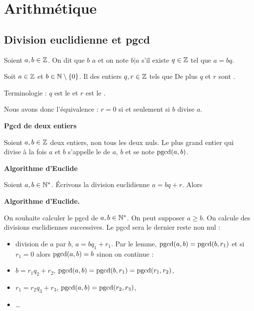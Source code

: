 \documentclass[10pt,class=article,crop=false]{standalone}
\begin{document}
	
	
\section{Arithmétique}

\begin{multicols}{2}
	
	
\subsection{Division euclidienne et pgcd}

Soient $a,b \in \mathbb{Z}$. On dit que $b$  $a$ et on note $b | a$ s'il existe $q \in \mathbb{Z}$ tel que $a = bq$.

\begin{theoreme}
	Soit $a\in \mathbb{Z}$ et $b\in \mathbb{N}\setminus \{0\}$.
	Il  des entiers $q,r \in \mathbb{Z}$ tels que
	De plus $q$ et $r$ sont .
\end{theoreme}

Terminologie : $q$ est le  et $r$ est le .


Nous avons donc l'équivalence : $r=0$ si et seulement si $b$ divise $a$.



\textbf{Pgcd de deux entiers}

	Soient $a,b\in\mathbb{Z}$ deux entiers, non tous les deux nuls.
	Le plus grand entier qui divise à la fois $a$ et $b$ s'appelle
	le  de $a$, $b$
	et se note $\mathop{\text{pgcd}}(a,b)$.
	


\textbf{Algorithme d'Euclide}

\begin{lemme}
	\label{lem:algoeuclide}
	Soient $a,b \in \mathbb{N}^*$. \'Ecrivons la division euclidienne $a=bq+r$.
	Alors
\end{lemme}



\textbf{Algorithme d'Euclide.}

On souhaite calculer le pgcd de $a,b \in \mathbb{N}^*$. On peut supposer $a \ge b$.
On calcule des divisions euclidiennes successives. Le pgcd sera le dernier reste
non nul :
\begin{itemize}
	\item division de $a$ par $b$, $a=bq_1+r_1$. Par le lemme, $\mathop{\text{pgcd}}(a,b)=\mathop{\text{pgcd}}(b,r_1)$ et
	si $r_1=0$ alors $\mathop{\text{pgcd}}(a,b)=b$ sinon on continue :
	\item $b=r_1 q_2 + r_2$,  \quad $\mathop{\text{pgcd}}(a,b)= \mathop{\text{pgcd}}(b,r_1)=\mathop{\text{pgcd}}(r_1,r_2)$,
	\item $r_1 = r_2 q_3 + r_3$, \quad $\mathop{\text{pgcd}}(a,b)=\mathop{\text{pgcd}}(r_2,r_3)$,
	\item \ldots
\end{itemize}



\end{multicols}
\end{document}
